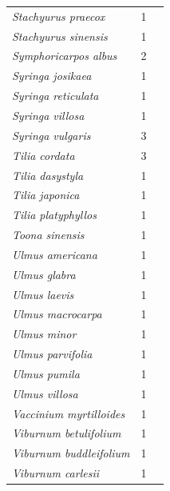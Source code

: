 \documentclass[11pt]{article}
\begin{document}
\begin{longtable}{p{}p{}p{}}
  \emph{Stachyurus praecox} &   1 & \emph{\citep{zohner2016}} \\ 
  \emph{Stachyurus sinensis} &   1 & \emph{\citep{zohner2016}} \\ 
  \emph{Symphoricarpos albus} &   2 & \emph{\citep{Laube:2014a,Laube:2014b}} \\ 
  \emph{Syringa josikaea} &   1 & \emph{\citep{zohner2016}} \\ 
  \emph{Syringa reticulata} &   1 & \emph{\citep{zohner2016}} \\ 
  \emph{Syringa villosa} &   1 & \emph{\citep{zohner2016}} \\ 
  \emph{Syringa vulgaris} &   3 & \emph{\citep{Basler:2012,Laube:2014a,Laube:2014b}} \\ 
  \emph{Tilia cordata} &   3 & \emph{\citep{Basler:2012,Caffarra:2011a,malyshev2018}} \\ 
  \emph{Tilia dasystyla} &   1 & \emph{\citep{zohner2016}} \\ 
  \emph{Tilia japonica} &   1 & \emph{\citep{zohner2016}} \\ 
  \emph{Tilia platyphyllos} &   1 & \emph{\citep{zohner2016}} \\ 
  \emph{Toona sinensis} &   1 & \emph{\citep{zohner2016}} \\ 
  \emph{Ulmus americana} &   1 & \emph{\citep{zohner2016}} \\ 
  \emph{Ulmus glabra} &   1 & \emph{\citep{Ghelardini:2010aa}} \\ 
  \emph{Ulmus laevis} &   1 & \emph{\citep{zohner2016}} \\ 
  \emph{Ulmus macrocarpa} &   1 & \emph{\citep{Ghelardini:2010aa}} \\ 
  \emph{Ulmus minor} &   1 & \emph{\citep{Ghelardini:2010aa}} \\ 
  \emph{Ulmus parvifolia} &   1 & \emph{\citep{Ghelardini:2010aa}} \\ 
  \emph{Ulmus pumila} &   1 & \emph{\citep{Ghelardini:2010aa}} \\ 
  \emph{Ulmus villosa} &   1 & \emph{\citep{Ghelardini:2010aa}} \\ 
  \emph{Vaccinium myrtilloides} &   1 & \emph{\citep{flynn2018}} \\ 
  \emph{Viburnum betulifolium} &   1 & \emph{\citep{zohner2016}} \\ 
  \emph{Viburnum buddleifolium} &   1 & \emph{\citep{zohner2016}} \\ 
  \emph{Viburnum carlesii} &   1 & \emph{\citep{zohner2016}} \\ 

\end{longtable}
\end{document}
